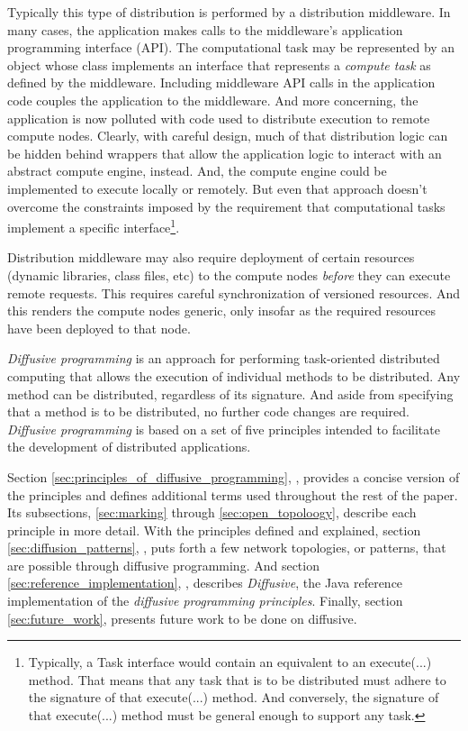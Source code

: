 \documentclass[11pt]{article}
\begin{document}
Typically this type of distribution is performed by a distribution middleware. In many cases, the application makes calls to the middleware's application programming interface (API). The computational task may be represented by an object whose class implements an interface that represents a \emph{compute task} as defined by the middleware. Including middleware API calls in the application code couples the application to the middleware. And more concerning, the application is now polluted with code used to distribute execution to remote compute nodes. Clearly, with careful design, much of that distribution logic can be hidden behind wrappers that allow the application logic to interact with an abstract compute engine, instead. And, the compute engine could be implemented to execute locally or remotely. But even that approach doesn't overcome the constraints imposed by the requirement that computational tasks implement a specific interface\footnote{Typically, a \textsf{Task} interface would contain an equivalent to an \textsf{execute(...)} method. That means that any task that is to be distributed must adhere to the signature of that \textsf{execute(...)} method. And conversely, the signature of that \textsf{execute(...)} method must be general enough to support any task.}.

Distribution middleware may also require deployment of certain resources (dynamic libraries, class files, etc) to the compute nodes \emph{before} they can execute remote requests. This requires careful synchronization of versioned resources. And this renders the compute nodes generic, only insofar as the required resources have been deployed to that node.

\emph{Diffusive programming} is an approach for performing task-oriented distributed computing that allows the execution of individual methods to be distributed. Any method can be distributed, regardless of its signature. And aside from specifying that a method is to be distributed, no further code changes are required. \emph{Diffusive programming} is based on a set of five principles intended to facilitate the development of distributed applications. 

Section \ref{sec:principles_of_diffusive_programming}, \textit{}, provides a concise version of the principles and defines additional terms used throughout the rest of the paper. Its subsections, \ref{sec:marking} through \ref{sec:open_topoloogy}, describe each principle in more detail. With the principles defined and explained, section \ref{sec:diffusion_patterns}, \textit{}, puts forth a few network topologies, or patterns, that are possible through diffusive programming. And section \ref{sec:reference_implementation}, \textit{}, describes \emph{Diffusive}, the Java reference implementation of the \emph{diffusive programming principles}. Finally, section \ref{sec:future_work}, presents future work to be done on diffusive.
\end{document}
